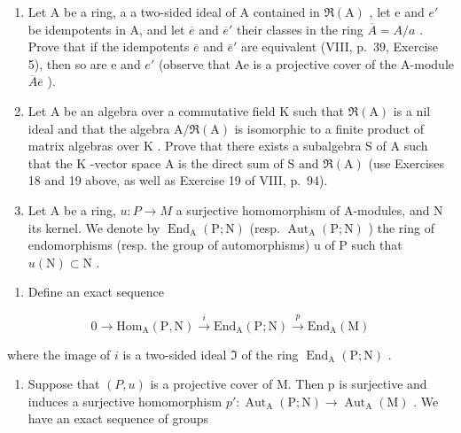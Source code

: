 \begin{enumerate}
\def\labelenumi{\arabic{enumi})}
\setcounter{enumi}{18}
\item
  Let A be a ring, a a two-sided ideal of A contained in \(\Re(\mathrm{A})\) , let e and \(e'\) be idempotents in A, and let \(\overline{e}\) and \(\overline{e}'\) their classes in the ring \(\overline{A} = A/a\) . Prove that if the idempotents \(\overline{e}\) and \(\overline{e}'\) are equivalent (VIII, p.~39, Exercise 5), then so are e and \(e'\) (observe that Ae is a projective cover of the A-module \(\overline{A}\overline{e}\) ).
\item
  Let \(\mathrm{A}\) be an algebra over a commutative field \(\mathrm{K}\) such that \(\Re(\mathrm{A})\) is a nil ideal and that the algebra \(\mathrm{A} / \Re(\mathrm{A})\) is isomorphic to a finite product of matrix algebras over \(\mathrm{K}\) . Prove that there exists a subalgebra \(\mathrm{S}\) of \(\mathrm{A}\) such that the \(\mathrm{K}\) -vector space \(\mathrm{A}\) is the direct sum of \(\mathrm{S}\) and \(\Re(\mathrm{A})\) (use Exercises 18 and 19 above, as well as Exercise 19 of VIII, p.~94).
\item
  Let A be a ring, \(u: P \to M\) a surjective homomorphism of A-modules, and N its kernel. We denote by \(\operatorname{End}_{\mathrm{A}}(\mathrm{P}; \mathrm{N})\) (resp. \(\operatorname{Aut}_{\mathrm{A}}(\mathrm{P}; \mathrm{N})\) ) the ring of endomorphisms (resp. the group of automorphisms) u of P such that \(u(\mathrm{N}) \subset \mathrm{N}\) .
\end{enumerate}

\begin{enumerate}
\def\labelenumi{\alph{enumi})}
\tightlist
\item
  Define an exact sequence
\end{enumerate}

\[
0 \to \mathrm{Hom} _ {\mathrm{A}} (\mathrm{P}, \mathrm{N}) \xrightarrow {i} \mathrm{End} _ {\mathrm{A}} (\mathrm{P}; \mathrm{N}) \xrightarrow {p} \mathrm{End} _ {\mathrm{A}} (\mathrm{M})
\]

where the image of \(i\) is a two-sided ideal \(\mathfrak{I}\) of the ring \(\operatorname{End}_{\mathrm{A}}(\mathrm{P};\mathrm{N})\) .

\begin{enumerate}
\def\labelenumi{\alph{enumi})}
\setcounter{enumi}{1}
\tightlist
\item
  Suppose that \((P, u)\) is a projective cover of M. Then p is surjective and induces a surjective homomorphism \(p' : \operatorname{Aut}_{\mathrm{A}}(\mathrm{P}; \mathrm{N}) \to \operatorname{Aut}_{\mathrm{A}}(\mathrm{M})\) . We have an exact sequence of groups
\end{enumerate}

